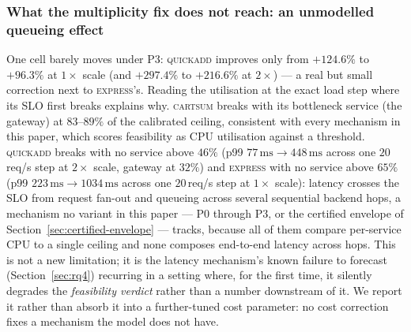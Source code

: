 \documentclass[journal, 10pt]{IEEEtran}
\begin{document}
\subsubsection{What the multiplicity fix does not reach: an unmodelled queueing effect}
\label{sec:rq6-latency}
One cell barely moves under P3: \textsc{quickadd} improves only from
$+124.6\%$ to $+96.3\%$ at $1\times$ scale (and $+297.4\%$ to $+216.6\%$ at
$2\times$) --- a real but small correction next to \textsc{express}'s. Reading
the utilisation at the exact load step where its SLO first breaks explains why.
\textsc{cartsum} breaks with its bottleneck service (the gateway) at
$83$--$89\%$ of the calibrated ceiling, consistent with every mechanism in
this paper, which scores feasibility as CPU utilisation against a threshold.
\textsc{quickadd} breaks with no service above $46\%$ (p99
$77\,\mathrm{ms}\to448\,\mathrm{ms}$ across one $20\,$req/s step at $2\times$
scale, gateway at $32\%$) and \textsc{express} with no service above $65\%$
(p99 $223\,\mathrm{ms}\to1034\,\mathrm{ms}$ across one $20\,$req/s step at
$1\times$ scale): latency crosses the SLO from request fan-out and queueing
across several sequential backend hops, a mechanism no variant in this paper
--- P0 through P3, or the certified envelope of
Section~\ref{sec:certified-envelope} --- tracks, because all of them compare
per-service CPU to a single ceiling and none composes end-to-end latency
across hops. This is not a new limitation; it is the latency mechanism's known
failure to forecast (Section~\ref{sec:rq4}) recurring in a setting where, for
the first time, it silently degrades the \emph{feasibility verdict} rather
than a number downstream of it. We report it rather than absorb it into a
further-tuned cost parameter: no cost correction fixes a mechanism the model
does not have.
\end{document}
